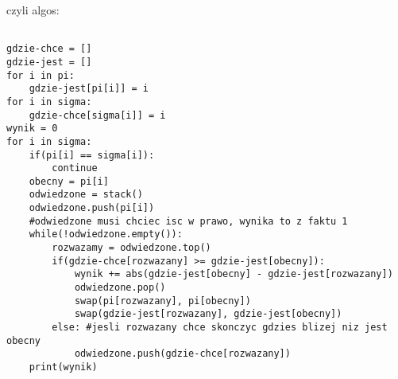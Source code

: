 \documentclass[12pt]{article}
\begin{document}
czyli algos:
\begin{lstlisting}

gdzie-chce = []
gdzie-jest = []
for i in pi:
    gdzie-jest[pi[i]] = i
for i in sigma:
    gdzie-chce[sigma[i]] = i 
wynik = 0
for i in sigma:
    if(pi[i] == sigma[i]):
        continue 
    obecny = pi[i]
    odwiedzone = stack() 
    odwiedzone.push(pi[i])
    #odwiedzone musi chciec isc w prawo, wynika to z faktu 1
    while(!odwiedzone.empty()):
        rozwazamy = odwiedzone.top()
        if(gdzie-chce[rozwazany] >= gdzie-jest[obecny]):
            wynik += abs(gdzie-jest[obecny] - gdzie-jest[rozwazany])
            odwiedzone.pop()
            swap(pi[rozwazany], pi[obecny])
            swap(gdzie-jest[rozwazany], gdzie-jest[obecny])
        else: #jesli rozwazany chce skonczyc gdzies blizej niz jest obecny
            odwiedzone.push(gdzie-chce[rozwazany])
    print(wynik)
\end{lstlisting}
\end{document}
